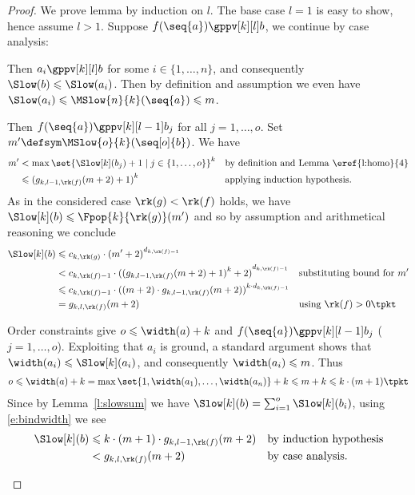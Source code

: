\documentclass{LMCS}
\begin{document}
\begin{proof}

  We prove lemma by induction on $l$.
  The base case $l = 1$ is easy to show, hence 
  assume $l > 1$. 
  Suppose $f(\seq{a}) \gppv[k][l] b$, we continue by case analysis:
  \begin{description}[leftmargin=0.3cm]
  \item[\dcase{$f(\seq{a}) \cppv{st}[k][l] b$}] 
  Then $a_i \gppv[k][l] b$ for some $i \in \{1,\dots,n\}$,
  and consequently $\Slow(b) \leqslant \Slow(a_i)$. 
  Then by definition and assumption we even have $\Slow(a_i) \leqslant \MSlow{n}{k}(\seq{a}) \leqslant m$.

  \item[\dcase{$f(\seq{a}) \cppv{ia}[k][l] b$ where $b = g(\seq[o]{b})}$] 
    Then 
    $f(\seq{a}) \gppv[k][l-1] b_j$ for all $j = 1,\dots,o$.
    Set $m' \defsym \MSlow{o}{k}(\seq[o]{b})$. We have
    \begin{align*}
      m' & < \max\set{\Slow[k](b_j) + 1 \mid j \in \{1,\dots,o\}}^k 
      && \text{by definition and Lemma~\eref{l:homo}{4}} \\
      & \leqslant {(g_{k,l-1,\rk(f)}(m+2)+ 1)}^k
      && \text{applying induction hypothesis.}
    \end{align*}
    As in the considered case $\rk(g) < \rk(f)$ holds, we have
    $\Slow[k](b) \leqslant \Fpop{k}{\rk(g)}(m')$ 
    and so by assumption and arithmetical reasoning we conclude
    \begin{align*}
      \Slow[k](b) 
      & \leqslant c_{k,\rk(g)} \cdot {(m' + 2)}^{d_{k,\rk(f)-1}} && \\
& < c_{k,\rk(f)-1} \cdot {({(g_{k,l-1,\rk(f)}(m+2)+ 1)}^k + 2)}^{d_{k,\rk(f)-1}} && \text{substituting bound for $m'$} \\
      & \leqslant c_{k,\rk(f)-1} \cdot {((m+2) \cdot g_{k,l-1,\rk(f)}(m+2))}^{k \cdot d_{k,\rk(f)-1}} && \\
      & = g_{k,l,\rk(f)}(m+2) && \text{using $\rk(f) > 0$}\tpkt
    \end{align*}
  \item[\dcase{$f(\seq{a}) \cppv{ialst}[k][l] b$ where $b = \lseq[o]{b}}$]
    Order constraints give $o \leqslant \width(a) + k$
    and $f(\seq{a}) \gppv[k][l-1] b_j$ ($j = 1,\dots,o$).
    Exploiting that $a_i$ is ground, a standard argument shows 
    that $\width(a_i) \leqslant \Slow[k](a_i)$, and consequently 
    $\width(a_i) \leqslant m$.
    Thus
    \begin{align}
      \label{e:bindwidth}
      o \leqslant \width(a) + k 
      = \max\set{1,\width(a_1), \dots,\width(a_n)} + k
      \leqslant m + k \leqslant k \cdot (m + 1) \tpkt
    \end{align}
    Since by Lemma~\ref{l:slowsum} we have $\Slow[k](b) = \sum_{i=1}^o \Slow[k](b_i)$, 
    using \eqref{e:bindwidth} we see
    \begin{align*}
     \Slow[k](b) & \leqslant k \cdot (m + 1) \cdot g_{k,l-1,\rk(f)}(m+2) && \text{by induction hypothesis} \\
     & < g_{k,l,\rk(f)}(m+2) && \text{by case analysis.}
    \end{align*}
  \end{description}
\end{proof}
\end{document}
